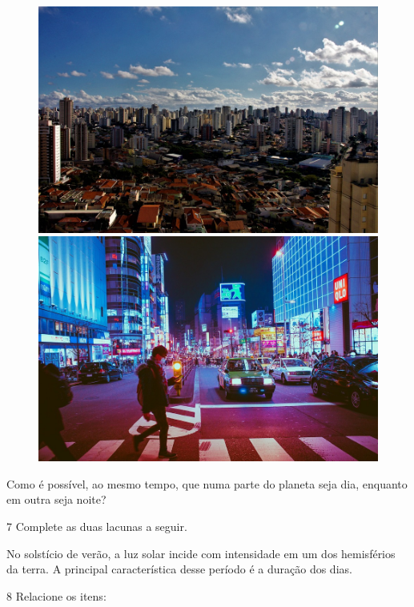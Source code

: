 \begin{figure}[htpb!]
\includegraphics[width=.5\textwidth]{./imgs/img4.png}
\includegraphics[width=.5\textwidth]{./imgs/img5.png}
\end{figure}

\noindent{}Como é possível, ao mesmo tempo, que numa parte do planeta seja dia,
enquanto em outra seja noite?


\pagebreak
\num{7} Complete as duas lacunas a seguir.

No solstício de verão, a luz solar incide com  intensidade em um dos hemisférios da terra. A principal característica desse período é a  duração dos dias.\bigskip

\num{8} Relacione os itens:

